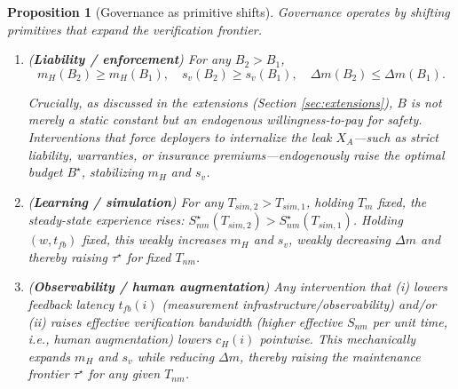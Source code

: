 \documentclass[12pt, letter]{article}
\newtheorem{proposition}{Proposition}
\begin{document}
\begin{proposition}[Governance as primitive shifts]\label{prop:governance-core}
Governance operates by shifting primitives that expand the verification frontier.

\begin{enumerate}
  \item (\textbf{Liability / enforcement}) For any $B_2>B_1$,
  \[
  m_H(B_2)\ge m_H(B_1),\quad s_v(B_2)\ge s_v(B_1),\quad \Delta m(B_2)\le \Delta m(B_1).
  \]

  Crucially, as discussed in the extensions (Section \ref{sec:extensions}), $B$ is not merely a static constant but an endogenous willingness-to-pay for safety. Interventions that force deployers to internalize the leak $X_A$---such as strict liability, warranties, or insurance premiums---endogenously raise the optimal budget $B^\star$, stabilizing $m_H$ and $s_v$.
  
  \item (\textbf{Learning / simulation}) For any $T_{sim,2}>T_{sim,1}$, holding $T_m$ fixed, the steady-state experience rises:
  $S^\star_{nm}(T_{sim,2})>S^\star_{nm}(T_{sim,1})$.
  Holding $(w,t_{fb})$ fixed, this weakly increases $m_H$ and $s_v$, weakly decreasing $\Delta m$ and thereby raising $\tau^\star$ for fixed $T_{nm}$.
  \item (\textbf{Observability / human augmentation}) Any intervention that (i) lowers feedback latency $t_{fb}(i)$ (measurement infrastructure/observability) and/or (ii) raises effective verification bandwidth (higher effective $S_{nm}$ per unit time, i.e., human augmentation) lowers $c_H(i)$ pointwise. This mechanically expands $m_H$ and $s_v$ while reducing $\Delta m$, thereby raising the maintenance frontier $\tau^\star$ for any given $T_{nm}$.


  \end{enumerate}

\end{proposition}
\end{document}

